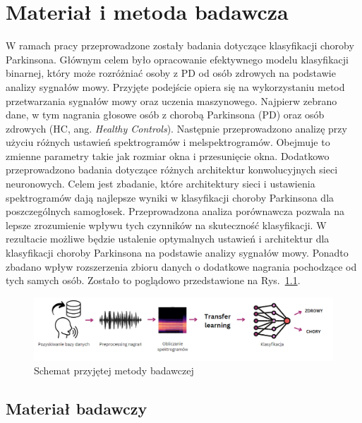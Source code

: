 \chapter{Materiał i metoda badawcza}
\label{ch:material-badawczy}

W ramach pracy przeprowadzone zostały badania dotyczące klasyfikacji choroby Parkinsona.
Głównym celem było opracowanie efektywnego modelu klasyfikacji binarnej, który może rozróżniać osoby z PD od osób zdrowych na podstawie analizy sygnałów mowy.
Przyjęte podejście opiera się na wykorzystaniu metod przetwarzania sygnałów mowy oraz uczenia maszynowego.
Najpierw zebrano dane, w tym nagrania głosowe osób z chorobą Parkinsona
(PD) oraz osób zdrowych (HC, ang. \emph{Healthy Controls}).
Następnie przeprowadzono analizę przy użyciu różnych ustawień spektrogramów i melspektrogramów.
Obejmuje to zmienne parametry takie jak rozmiar okna i przesunięcie okna.
Dodatkowo przeprowadzono badania dotyczące różnych architektur konwolucyjnych sieci neuronowych.
Celem jest zbadanie, które architektury sieci i ustawienia spektrogramów dają najlepsze wyniki w klasyfikacji choroby Parkinsona dla poszczególnych samogłosek.
Przeprowadzona analiza porównawcza pozwala na lepsze zrozumienie wpływu tych czynników na skuteczność klasyfikacji.
W rezultacie możliwe będzie ustalenie optymalnych ustawień i
architektur dla klasyfikacji choroby Parkinsona na podstawie analizy sygnałów mowy.
Ponadto zbadano wpływ rozszerzenia zbioru danych o dodatkowe nagrania pochodzące od tych samych osób.
Zostało to poglądowo przedstawione na Rys.~\ref{fig:methodology}.

\begin{figure}[htbp]
	\centering
	\includegraphics[width=1\textwidth]{./img/methodology}
	\caption{Schemat przyjętej metody badawczej}
    \label{fig:methodology}
\end{figure}


\section{Materiał badawczy}
\label{sec:material-badawczy}

